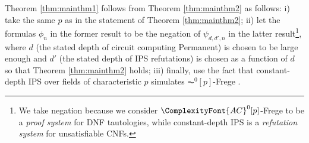 \documentclass[11pt,letter]{article}
\theoremstyle{remark} %
\newcommand{\ACZ}{\ensuremath{\ComplexityFont{AC}^0}}
\newcommand{\ACZP}{\ensuremath{\ACZ[p]}}
\begin{document}
    Theorem \ref{thm:mainthm1} follows from Theorem \ref{thm:mainthm2} as follows: i) take the same $p$ as in the statement of Theorem \ref{thm:mainthm2};
    ii) let the formulas $\phi_n$ in the former result to be the negation of $\psi_{d,d',n}$ in the latter result\footnote{We take negation because we consider \ACZP-Frege to be a {\it proof system} for DNF tautologies, while constant-depth IPS is a {\it refutation system} for unsatisfiable CNFs.}, where $d$ (the stated depth of circuit computing Permanent) is chosen to be large enough and $d'$ (the stated depth of IPS refutations) is chosen as a function of $d$ so that Theorem \ref{thm:mainthm2} holds; 
    iii) finally, use the fact that constant-depth IPS over fields of characteristic $p$ simulates $\AC^0[p]$-Frege \cite{GP18}.











    
\end{document}
